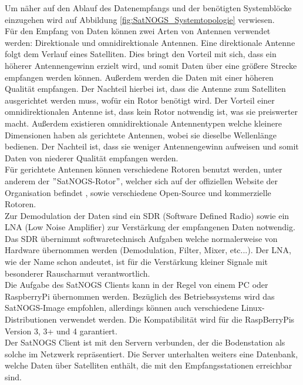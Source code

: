 Um näher auf den Ablauf des Datenempfangs und der benötigten Systemblöcke einzugehen wird auf Abbildung \ref{fig:SatNOGS_Systemtopologie} verwiesen.\\

Für den Empfang von Daten können zwei Arten von Antennen verwendet werden: Direktionale und omnidirektionale Antennen. Eine direktionale Antenne folgt dem Verlauf eines Satelliten. Dies bringt den Vorteil mit sich, dass ein höherer Antennengewinn erzielt wird, und somit Daten über eine größere Strecke empfangen werden können. Außerdem werden die Daten mit einer höheren Qualität empfangen. Der Nachteil hierbei ist, dass die Antenne zum Satelliten ausgerichtet werden muss, wofür ein Rotor benötigt wird. Der Vorteil einer omnidirektionalen Antenne ist, dass kein Rotor notwendig ist, was sie preiswerter macht. Außerdem existieren omnidirektionale Antennentypen welche kleinere Dimensionen haben als gerichtete Antennen, wobei sie dieselbe Wellenlänge bedienen. Der Nachteil ist, dass sie weniger Antennengewinn aufweisen und somit Daten von niederer Qualität empfangen werden.\\

Für gerichtete Antennen können verschiedene Rotoren benutzt werden, unter anderem der $"$SatNOGS-Rotor$"$, welcher sich auf der offiziellen Website der Organisation befindet \cite{SatNOGS_rotor}, sowie verschiedene Open-Source und kommerzielle Rotoren.\\

Zur Demodulation der Daten sind ein SDR (Software Defined Radio) sowie ein LNA (Low Noise Amplifier) zur Verstärkung der empfangenen Daten notwendig. Das SDR übernimmt softwaretechnisch Aufgaben welche normalerweise von Hardware übernommen werden (Demodulation, Filter, Mixer, etc...)\cite{ulversoy_software_2010}. Der LNA, wie der Name schon andeutet, ist für die Verstärkung kleiner Signale mit besonderer Rauscharmut verantwortlich\cite{nguyen_cmos_2004}. \\

Die Aufgabe des SatNOGS Clients kann in der Regel von einem PC oder RaspberryPi übernommen werden. Bezüglich des Betriebssystems wird das SatNOGS-Image empfohlen, allerdings können auch verschiedene Linux-Distributionen verwendet werden. Die Kompatibilität wird für die RaspBerryPis Version 3, 3+ und 4 garantiert\cite{satnogs-raspberry}.\\

Der SatNOGS Client ist mit den Servern verbunden, der die Bodenstation als solche im Netzwerk repräsentiert. Die Server unterhalten weiters eine Datenbank, welche Daten über Satelliten enthält, die mit den Empfangsstationen erreichbar sind.
\pagebreak